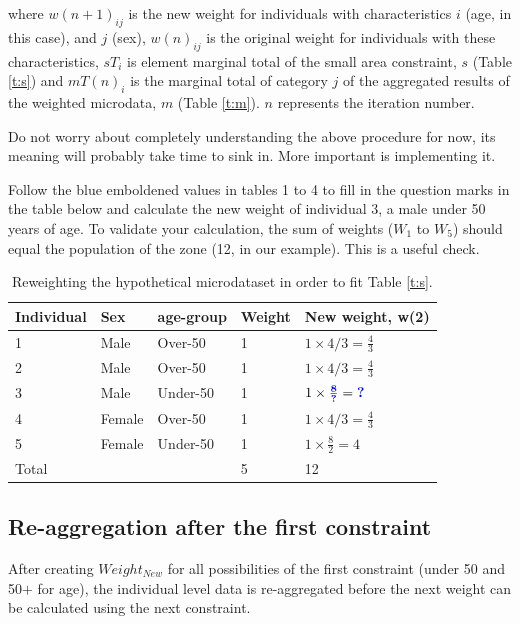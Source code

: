 \documentclass[a4paper, 11pt, twoside]{article}
\begin{document}
where $w(n+1)_{ij}$ is the new weight for individuals with characteristics $i$
(age, in this case), and $j$ (sex),  $w(n)_{ij}$ is the original
weight for individuals with these characteristics, $sT_{i}$ is element
marginal total of the small area constraint, $s$
(Table \ref{t:s}) and $mT(n)_{i}$ is the marginal total of category
$j$ of the aggregated results of the weighted
microdata, $m$ (Table \ref{t:m}).
$n$ represents the iteration number.

Do not worry about completely understanding the above procedure for now, its
meaning will probably take time to sink in.
More important is implementing it.

Follow the blue emboldened values in tables 1 to 4 to fill in the
question marks in the table below and calculate the new weight
of individual 3, a male under 50 years of age.
To validate your calculation, the sum of weights ($W_1$ to $W_5$)
should equal the population of the zone (12, in our example). This is a
useful check.

\begin{table}[htbp]
\centering
\caption{Reweighting the hypothetical microdataset in order to fit
Table \ref{t:s}.}
\begin{tabular}{lllll}
\toprule
{Individual} & {Sex} & {age-group} & {Weight} &
{New weight, w(2)} \\ \midrule
1 & Male & Over-50 & 1 & $1 \times 4/3 = \frac{4}{3}$ \\
2 & Male & Over-50 & 1 & $1 \times 4/3 = \frac{4}{3}$ \\
3 & Male & Under-50 & 1 & $1 \times \frac{\textbf{\color{blue}8}}{\textbf{\color{blue}?}} = \textbf{\color{blue}?}$ \\
4 & Female & Over-50 & 1 & $1 \times 4/3 = \frac{4}{3}$ \\
5 & Female & Under-50 & 1 & $1 \times \frac{8}{2} = 4$ \\
\midrule
Total & & & 5 & 12 \\
\bottomrule
\end{tabular}
\label{t:new-weights}
\end{table}

\subsection{Re-aggregation after the first constraint}
After creating $Weight_{New}$ for all possibilities of the first constraint (under 50 and 50$+$ for age),
the individual level data is re-aggregated before the next weight can be calculated using the next constraint.
\end{document}
